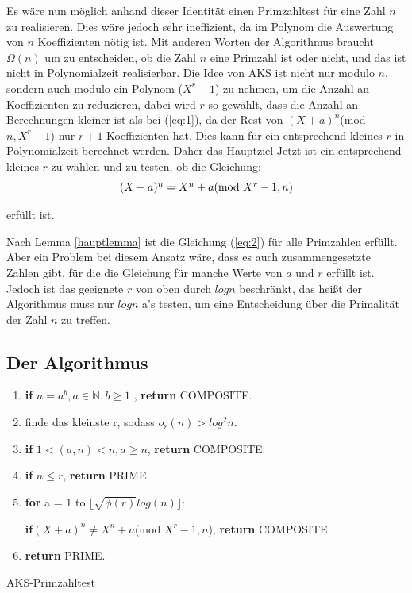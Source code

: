 \documentclass[12pt,oneside]{article}
\theoremstyle{remark}
\theoremstyle{definition}
\begin{document}
\begin{flushleft}
Es wäre nun möglich anhand dieser Identität einen Primzahltest für eine Zahl $n$ zu realisieren. Dies wäre jedoch sehr ineffizient, da im Polynom die Auswertung von $n$ Koeffizienten nötig ist. Mit anderen Worten der Algorithmus braucht $\Omega(n)$ um zu entscheiden, ob die Zahl $n$ eine Primzahl ist oder nicht, und das ist nicht in Polynomialzeit realisierbar. Die Idee von AKS ist nicht nur modulo $n$, sondern auch modulo ein Polynom ($X^r -1$) zu nehmen, um die Anzahl an Koeffizienten zu reduzieren, dabei wird $r$ so gewählt, dass die Anzahl an Berechnungen kleiner ist als bei (\ref{eq:1}), da der Rest von $(X + a)^n$(mod $ n, X^r - 1$) nur $ r + 1$ Koeffizienten hat. Dies kann für ein entsprechend kleines $r$ in Polynomialzeit berechnet werden. Daher das Hauptziel Jetzt ist ein entsprechend kleines $r$ zu wählen und zu testen, ob die Gleichung:\newline\newline
\begin{equation}\label{eq:2}
    \centerline{$(X + a)^n = X^n + a $(mod $X^r - 1, n$)}
\end{equation}

erfüllt ist.\newline

Nach Lemma \ref{hauptlemma} ist die Gleichung (\ref{eq:2}) für alle Primzahlen erfüllt. Aber ein Problem bei diesem Ansatz wäre, dass es auch zusammengesetzte Zahlen gibt, für die die Gleichung für manche Werte von $a$ und $r$ erfüllt ist. Jedoch ist das geeignete $r$ von oben durch $log n$ beschränkt, das heißt der Algorithmus muss nur $log n$ a's testen, um eine Entscheidung über die Primalität der Zahl $n$ zu treffen.

\end{flushleft}
\subsection{Der Algorithmus}\label{algo}
\begin{algorithm}[H]
\SetAlgoLined
{}

\begin{enumerate}
\item \textbf{if} $n = a^b, a \in \mathbb{N}, b \geq 1$ , \textbf{return} COMPOSITE.
\item  finde das kleinste r, sodass $o_{r}(n) > log^2 n $.
\item \textbf{if} $1 < (a,n) < n, a \geq n $, \textbf{return} COMPOSITE.
\item \textbf{if} $n \leq r $, \textbf{return} PRIME.
\item \textbf{for} a = 1 to $\lfloor \sqrt{\phi(r)}log(n) \rfloor$:

 \textbf{if}$(X + a)^n \neq X^n + a $(mod $X^r - 1, n$), \textbf{return} COMPOSITE.
 \item \textbf{return} PRIME.
\end{enumerate}
 
\caption{AKS-Primzahltest}
\end{algorithm}
\end{document}
